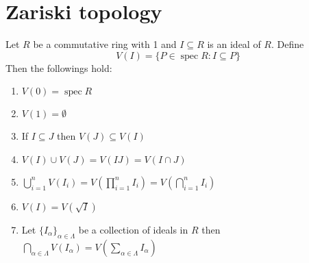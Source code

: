 \documentclass[11pt]{amsart}
\DeclareMathOperator{\spec}{\text{spec}}
\begin{document}
\section{Zariski topology}
Let $R$ be a commutative ring with 1 and $I\subseteq R$ is an ideal of $R$. Define $$V(I)=\{P\in \spec R:I\subseteq P\}$$
Then the followings hold: \begin{enumerate}
\item $V(0)=\spec R$
\item $V(1)=\emptyset$
\item If $I\subseteq J$ then $V(J)\subseteq V(I)$ 
\item $V(I)\cup V(J)=V(IJ)=V(I\cap J)$
\item $\displaystyle\bigcup_{i=1}^n V(I_i)=V\left(\displaystyle\prod_{i=1}^n I_i\right)=V\left(\displaystyle\bigcap_{i=1}^n I_i\right)$
\item $V(I)=V(\sqrt{I})$
\item Let $\{I_{\alpha}\}_{\alpha\in \Lambda}$ be a collection of ideals in $R$ then $\displaystyle\bigcap_{\alpha\in \Lambda} V(I_{\alpha})=V\left(\displaystyle\sum_{\alpha\in \Lambda} I_{\alpha}\right)$
\end{enumerate}
\end{document}
